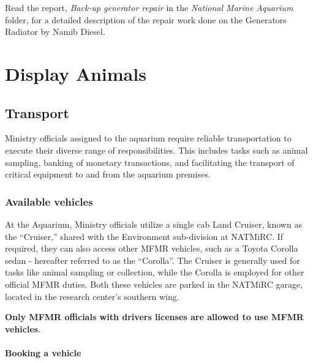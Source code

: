 \documentclass[
  letterpaper,
  DIV=11,
  numbers=noendperiod]{scrreprt}
\begin{document}
{Read the report, \emph{Back-up generator repair} in the \emph{National
Marine Aquarium} folder, for a detailed description of the repair work
done on the Generators Radiator by Namib Diesel}.

\part{Display Animals}

\hypertarget{transport}{%
\chapter{Transport}\label{transport}}

Ministry officials assigned to the aquarium require reliable
transportation to execute their diverse range of responsibilities. This
includes tasks such as animal sampling, banking of monetary
transactions, and facilitating the transport of critical equipment to
and from the aquarium premises.

\hypertarget{available-vehicles}{%
\section{Available vehicles}\label{available-vehicles}}

At the Aquarium, Ministry officials utilize a single cab Land Cruiser,
known as the ``Cruiser,'' shared with the Environment sub-division at
NATMiRC. If required, they can also access other MFMR vehicles, such as
a Toyota Corolla sedan - hereafter referred to as the ``Corolla''. The
Cruiser is generally used for tasks like animal sampling or collection,
while the Corolla is employed for other official MFMR duties. Both these
vehicles are parked in the NATMiRC garage, located in the research
center's southern wing.

\textbf{Only MFMR officials with drivers licenses are allowed to use
MFMR vehicles}.

\hypertarget{sec-book-vehicle}{%
\subsection{Booking a vehicle}\label{sec-book-vehicle}}
\end{document}
